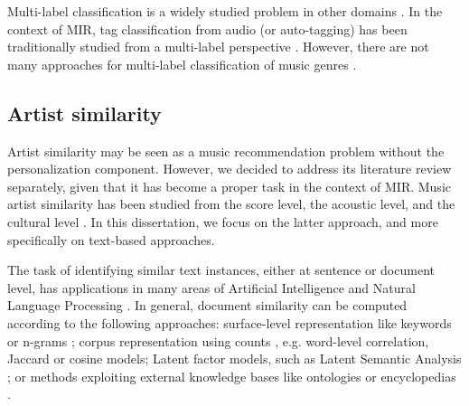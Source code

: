 Multi-label classification is a widely studied problem in other domains \citep{tsoumakas2006multi,jain2016extreme}. In the context of MIR, tag classification from audio (or auto-tagging) has been traditionally studied from a multi-label perspective \citep{sordo2007annotating,wang2009tag,Choi2016}. However, there are not many approaches for multi-label classification of music genres \citep{Sanden2011,wang2009tag}.


\subsection{Artist similarity}
\label{sec:SOA:mir:similarity}

Artist similarity may be seen as a music recommendation problem without the personalization component. However, we decided to address its literature review separately, given that it has become a proper task in the context of MIR.
Music artist similarity has been studied from the score level, the acoustic level, and the cultural level \citep{Ellis2002}. In this dissertation, we focus on the latter approach, and more specifically on text-based approaches. %

The task of identifying similar text instances, either at sentence or document level, has applications in many areas of Artificial Intelligence and Natural Language Processing \citep{LiuandWang2014}. In general, document similarity can be computed according to the following approaches: surface-level representation like keywords or n-grams \citep{ChimandDeng2008}; corpus representation using counts \citep{Rorvig1999}, e.g. word-level correlation, Jaccard or cosine models; Latent factor models, such as Latent Semantic Analysis \citep{Deerwesteretal1990}; or methods exploiting external knowledge bases like ontologies or encyclopedias \citep{Huetal2009}.

